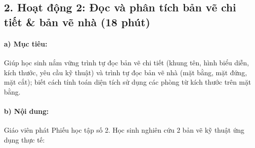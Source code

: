 \documentclass[12pt, a4paper]{article}
\begin{document}
\subsection*{2. Hoạt động 2: Đọc và phân tích bản vẽ chi tiết \& bản vẽ nhà (18 phút)}

\paragraph{a) Mục tiêu:} Giúp học sinh nắm vững trình tự đọc bản vẽ chi tiết (khung tên, hình biểu diễn, kích thước, yêu cầu kỹ thuật) và trình tự đọc bản vẽ nhà (mặt bằng, mặt đứng, mặt cắt); biết cách tính toán diện tích sử dụng các phòng từ kích thước trên mặt bằng.

\paragraph{b) Nội dung:} Giáo viên phát Phiếu học tập số 2. Học sinh nghiên cứu 2 bản vẽ kỹ thuật ứng dụng thực tế:
\end{document}
